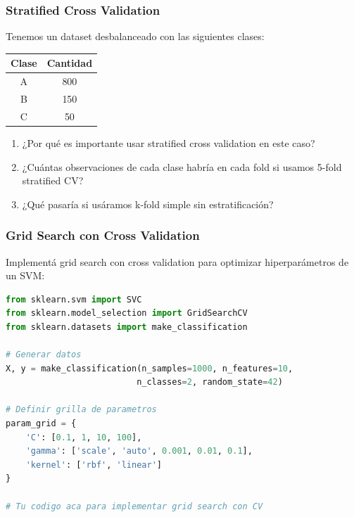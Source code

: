 \documentclass[12pt]{article}
\begin{document}
\subsubsection{Stratified Cross Validation}

Tenemos un dataset desbalanceado con las siguientes clases:

\begin{table}[H]
    \centering
    \begin{tabular}{cc}
        \toprule
        \textbf{Clase} & \textbf{Cantidad} \\
        \midrule
        A & 800 \\
        B & 150 \\
        C & 50 \\
        \bottomrule
    \end{tabular}
\end{table}

\begin{enumerate}
    \item ¿Por qué es importante usar stratified cross validation en este caso?
    \item ¿Cuántas observaciones de cada clase habría en cada fold si usamos 5-fold stratified CV?
    \item ¿Qué pasaría si usáramos k-fold simple sin estratificación?
\end{enumerate}

\subsubsection{Grid Search con Cross Validation}

Implementá grid search con cross validation para optimizar hiperparámetros de un SVM:

\begin{lstlisting}[language=Python]
from sklearn.svm import SVC
from sklearn.model_selection import GridSearchCV
from sklearn.datasets import make_classification

# Generar datos
X, y = make_classification(n_samples=1000, n_features=10, 
                          n_classes=2, random_state=42)

# Definir grilla de parametros
param_grid = {
    'C': [0.1, 1, 10, 100],
    'gamma': ['scale', 'auto', 0.001, 0.01, 0.1],
    'kernel': ['rbf', 'linear']
}

# Tu codigo aca para implementar grid search con CV
\end{lstlisting}
\end{document}

